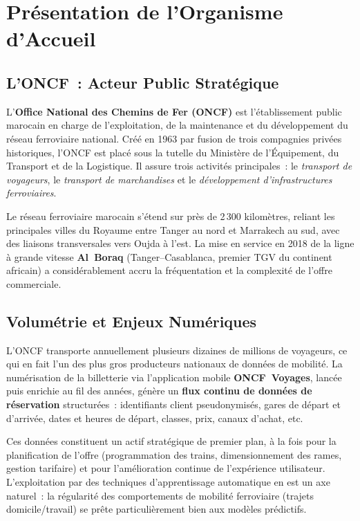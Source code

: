 \documentclass[11pt, a4paper]{article}
\begin{document}
\newpage
\section{Présentation de l'Organisme d'Accueil}

\subsection{L'ONCF~: Acteur Public Stratégique}

L'\textbf{Office National des Chemins de Fer (ONCF)} est l'établissement
public marocain en charge de l'exploitation, de la maintenance et du
développement du réseau ferroviaire national. Créé en 1963 par fusion de
trois compagnies privées historiques, l'ONCF est placé sous la tutelle du
Ministère de l'Équipement, du Transport et de la Logistique. Il assure
trois activités principales~: le \textit{transport de voyageurs}, le
\textit{transport de marchandises} et le \textit{développement
d'infrastructures ferroviaires}.

Le réseau ferroviaire marocain s'étend sur près de 2\,300 kilomètres,
reliant les principales villes du Royaume entre Tanger au nord et
Marrakech au sud, avec des liaisons transversales vers Oujda à l'est. La
mise en service en 2018 de la ligne à grande vitesse \textbf{Al~Boraq}
(Tanger--Casablanca, premier TGV du continent africain) a considérablement
accru la fréquentation et la complexité de l'offre commerciale.

\subsection{Volumétrie et Enjeux Numériques}

L'ONCF transporte annuellement plusieurs dizaines de millions de
voyageurs, ce qui en fait l'un des plus gros producteurs nationaux de
données de mobilité. La numérisation de la billetterie via l'application
mobile \textbf{ONCF~Voyages}, lancée puis enrichie au fil des années,
génère un \textbf{flux continu de données de réservation} structurées~:
identifiants client pseudonymisés, gares de départ et d'arrivée, dates
et heures de départ, classes, prix, canaux d'achat, etc.

Ces données constituent un actif stratégique de premier plan, à la fois
pour la planification de l'offre (programmation des trains, dimensionnement
des rames, gestion tarifaire) et pour l'amélioration continue de
l'expérience utilisateur. L'exploitation par des techniques d'apprentissage
automatique en est un axe naturel~: la régularité des comportements de
mobilité ferroviaire (trajets domicile/travail) se prête particulièrement
bien aux modèles prédictifs.
\end{document}
